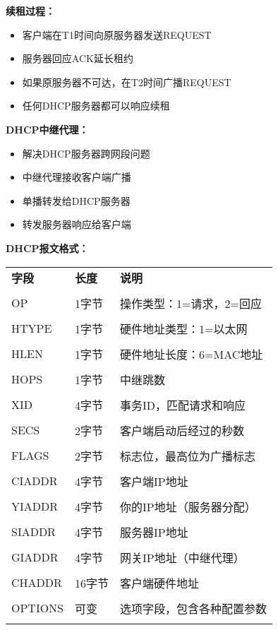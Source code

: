 \documentclass[lang=cn,newtx,10pt,scheme=chinese]{../../elegantbook}
\begin{document}
\textbf{续租过程：}
\begin{itemize}
  \item 客户端在T1时间向原服务器发送REQUEST
  \item 服务器回应ACK延长租约
  \item 如果原服务器不可达，在T2时间广播REQUEST
  \item 任何DHCP服务器都可以响应续租
\end{itemize}

\textbf{DHCP中继代理：}
\begin{itemize}
  \item 解决DHCP服务器跨网段问题
  \item 中继代理接收客户端广播
  \item 单播转发给DHCP服务器
  \item 转发服务器响应给客户端
\end{itemize}

\textbf{DHCP报文格式：}
\begin{longtable}{@{}p{3cm}p{2cm}p{8cm}@{}}
\toprule
\textbf{字段} & \textbf{长度} & \textbf{说明} \\\\ \midrule
\endhead

OP & 1字节 & 操作类型：1=请求，2=回应 \\\\
HTYPE & 1字节 & 硬件地址类型：1=以太网 \\\\
HLEN & 1字节 & 硬件地址长度：6=MAC地址 \\\\
HOPS & 1字节 & 中继跳数 \\\\
XID & 4字节 & 事务ID，匹配请求和响应 \\\\
SECS & 2字节 & 客户端启动后经过的秒数 \\\\
FLAGS & 2字节 & 标志位，最高位为广播标志 \\\\
CIADDR & 4字节 & 客户端IP地址 \\\\
YIADDR & 4字节 & 你的IP地址（服务器分配） \\\\
SIADDR & 4字节 & 服务器IP地址 \\\\
GIADDR & 4字节 & 网关IP地址（中继代理） \\\\
CHADDR & 16字节 & 客户端硬件地址 \\\\
OPTIONS & 可变 & 选项字段，包含各种配置参数 \\\\

\bottomrule
\end{longtable}
\end{document}
